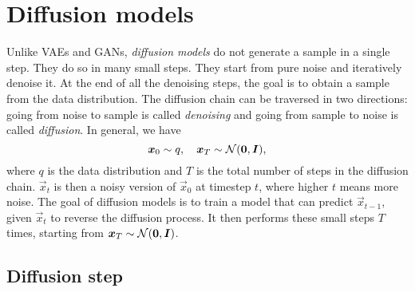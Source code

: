 \section{Diffusion models}

Unlike VAEs and GANs, \textit{diffusion models} \citep{ho2020denoising} do not generate a sample in a
single step. They do so in many small steps. They start from pure noise and iteratively denoise it.
At the end of all the denoising steps, the goal is to obtain a sample from the data distribution. The
diffusion chain can be traversed in two directions: going from noise to sample is called
\textit{denoising} and going from sample to noise is called \textit{diffusion}. In general, we have \[
    \bm{x}_0 \sim q, \quad \bm{x}_T \sim \mathcal{N}(\bm{0},\bm{I}),
\]
where $q$ is the data distribution and $T$ is the total number of steps in the diffusion chain.
$\vec{x}_t$ is then a noisy version of $\vec{x}_0$ at timestep $t$, where higher $t$ means more
noise. The goal of diffusion models is to train a model that can predict $\vec{x}_{t-1}$, given
$\vec{x}_t$ to reverse the diffusion process. It then performs these small steps $T$ times,
starting from $\bm{x}_T \sim \mathcal{N}(\bm{0},\bm{I})$.

\subsection{Diffusion step}

